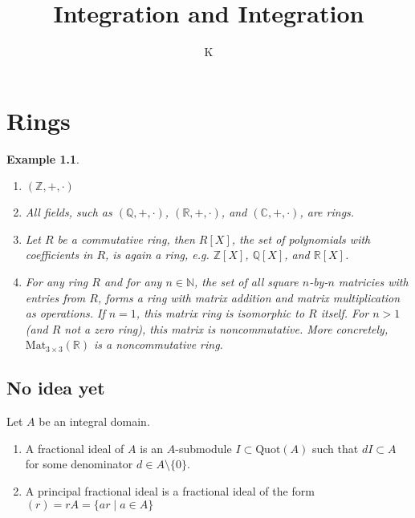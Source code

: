 \documentclass[a4paper]{book}
\title{Integration and Integration}
\author{K}
\theoremstyle{break}
\newtheorem{example}{Example}
\theoremstyle{plain}
\begin{document}

\chapter{Rings}

\begin{example}
    \begin{enumerate}
        \item \((\mathbb{Z}, +, \cdot)\)
        \item All fields, such as \((\mathbb{Q}, +, \cdot)\), \((\mathbb{R}, +, \cdot)\), and \((\mathbb{C}, +, \cdot)\), are rings.
        \item Let \(R\) be a commutative ring, then \(R[X]\), the set of polynomials with coefficients in \(R\), is again a ring, e.g. \(\mathbb{Z}[X]\), \(\mathbb{Q}[X]\), and \(\mathbb{R}[X]\).
        \item For any ring \(R\) and for any \(n \in \mathbb{N}\), the set of all square \(n\)-by-\(n\) matricies with entries from \(R\), forms a ring with matrix addition and matrix multiplication as operations. If \(n = 1\), this matrix ring is isomorphic to \(R\) itself. For \(n > 1\) (and \(R\) not a zero ring), this matrix is noncommutative. More concretely, \(\text{Mat}_{3 \times 3}(\mathbb{R})\) is a noncommutative ring. 
    \end{enumerate}
\end{example}

\section{No idea yet}

\begin{definition}
    Let \(A\) be an {\color{mathif}integral domain}.
    \begin{enumerate}
        \item A {\color{maththen}fractional ideal} of \(A\) is an {\color{mathif}\(A\)-submodule} \(I \subset \text{Quot}(A)\) such that \(d I \subset A\) for some {\color{mathrem}denominator} \(d \in A \setminus \{0\}\).
        \item A {\color{maththen}principal fractional ideal} is a {\color{mathif}fractional ideal} of the form \((r) = rA = \{ar \mid a \in A\}\)
    \end{enumerate}
\end{definition}
\end{document}
